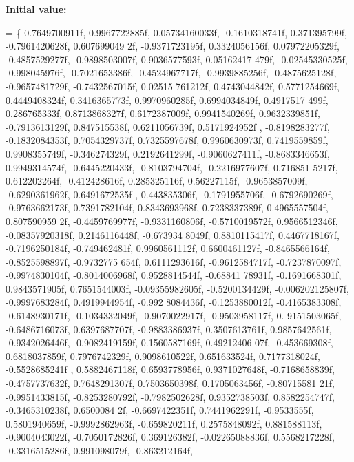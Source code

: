 {\bfseries Initial value\+:}
\begin{DoxyCode}
=
\{
    0.7649700911f, 0.9967722885f, 0.05734160033f, -0.1610318741f, 0.371395799f, -0.7961420628f, 0.607699049
      2f, -0.9371723195f, 0.3324056156f, 0.07972205329f, -0.4857529277f, -0.9898503007f, 0.9036577593f, 0.05162417
      479f, -0.02545330525f, -0.998045976f,
    -0.7021653386f, -0.4524967717f, -0.9939885256f, -0.4875625128f, -0.9657481729f, -0.7432567015f, 0.02515
      761212f, 0.4743044842f, 0.5771254669f, 0.4449408324f, 0.3416365773f, 0.9970960285f, 0.6994034849f, 0.4917517
      499f, 0.286765333f, 0.8713868327f,
    0.6172387009f, 0.9941540269f, 0.9632339851f, -0.7913613129f, 0.847515538f, 0.6211056739f, 0.5171924952f
      , -0.8198283277f, -0.1832084353f, 0.7054329737f, 0.7325597678f, 0.9960630973f, 0.7419559859f, 0.9908355749f,
       -0.346274329f, 0.2192641299f,
    -0.9060627411f, -0.8683346653f, 0.9949314574f, -0.6445220433f, -0.8103794704f, -0.2216977607f, 0.716851
      5217f, 0.612202264f, -0.412428616f, 0.285325116f, 0.56227115f, -0.9653857009f, -0.6290361962f, 0.6491672535f
      , 0.443835306f, -0.1791955706f,
    -0.6792690269f, -0.9763662173f, 0.7391782104f, 0.8343693968f, 0.7238337389f, 0.4965557504f, 0.807590959
      2f, -0.4459769977f, -0.9331160806f, -0.5710019572f, 0.9566512346f, -0.08357920318f, 0.2146116448f, -0.673934
      8049f, 0.8810115417f, 0.4467718167f,
    -0.7196250184f, -0.749462481f, 0.9960561112f, 0.6600461127f, -0.8465566164f, -0.8525598897f, -0.9732775
      654f, 0.6111293616f, -0.9612584717f, -0.7237870097f, -0.9974830104f, -0.8014006968f, 0.9528814544f, -0.68841
      78931f, -0.1691668301f, 0.9843571905f,
    0.7651544003f, -0.09355982605f, -0.5200134429f, -0.006202125807f, -0.9997683284f, 0.4919944954f, -0.992
      8084436f, -0.1253880012f, -0.4165383308f, -0.6148930171f, -0.1034332049f, -0.9070022917f, -0.9503958117f, 0.
      9151503065f, -0.6486716073f, 0.6397687707f,
    -0.9883386937f, 0.3507613761f, 0.9857642561f, -0.9342026446f, -0.9082419159f, 0.1560587169f, 0.49212406
      07f, -0.453669308f, 0.6818037859f, 0.7976742329f, 0.9098610522f, 0.651633524f, 0.7177318024f, -0.5528685241f
      , 0.5882467118f, 0.6593778956f,
    0.9371027648f, -0.7168658839f, -0.4757737632f, 0.7648291307f, 0.7503650398f, 0.1705063456f, -0.80715581
      21f, -0.9951433815f, -0.8253280792f, -0.7982502628f, 0.9352738503f, 0.8582254747f, -0.3465310238f, 0.6500084
      2f, -0.6697422351f, 0.7441962291f,
    -0.9533555f, 0.5801940659f, -0.9992862963f, -0.659820211f, 0.2575848092f, 0.881588113f, -0.9004043022f,
       -0.7050172826f, 0.369126382f, -0.02265088836f, 0.5568217228f, -0.3316515286f, 0.991098079f, -0.863212164f, 

\end{DoxyCode}
